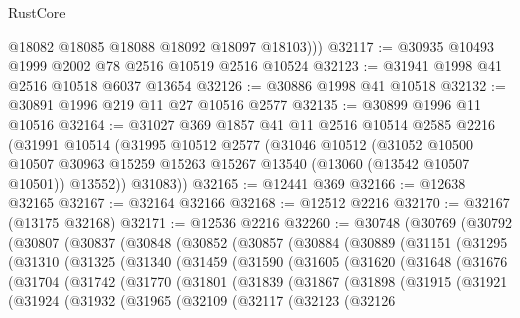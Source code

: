 \begin{lexlean}{RustCore}
\begin{coremodule}
          @18082
          @18085
          @18088
          @18092
          @18097
          @18103)))
@32117 := @30935 @10493 @1999 @2002 @78 @2516 @10519 @2516 @10524
@32123 := @31941 @1998 @41 @2516 @10518 @6037 @13654
@32126 := @30886 @1998 @41 @10518
@32132 := @30891 @1996 @219 @11 @27 @10516 @2577
@32135 := @30899 @1996 @11 @10516
@32164 := @31027
    @369
    @1857
    @41
    @11
    @2516
    @10514
    @2585
    @2216
    (@31991
      @10514
      (@31995
        @10512
        @2577
        (@31046
          @10512
          (@31052
            @10500
            @10507
            @30963
            @15259
            @15263
            @15267
            @13540
            (@13060 (@13542 @10507 @10501))
            @13552))
        @31083))
@32165 := @12441 @369
@32166 := @12638 @32165
@32167 := @32164 @32166
@32168 := @12512 @2216
@32170 := @32167 (@13175 @32168)
@32171 := @12536 @2216
@32260 := @30748
    (@30769
      (@30792
        (@30807
          (@30837
            (@30848
              (@30852
                (@30857
                  (@30884
                    (@30889
                      (@31151
                        (@31295
                          (@31310
                            (@31325
                              (@31340
                                (@31459
                                  (@31590
                                    (@31605
                                      (@31620
                                        (@31648
                                          (@31676
                                            (@31704
                                              (@31742
                                                (@31770
                                                  (@31801
                                                    (@31839
                                                      (@31867
                                                        (@31898
                                                          (@31915
                                                            (@31921
                                                              (@31924
                                                                (@31932
                                                                  (@31965
                                                                    (@32109
                                                                      (@32117
                                                                        (@32123
                                                                          (@32126

\end{coremodule}
\end{lexlean}
